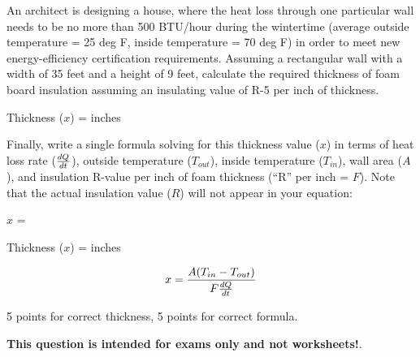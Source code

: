 

An architect is designing a house, where the heat loss through one particular wall needs to be no more than 500 BTU/hour during the wintertime (average outside temperature = 25 deg F, inside temperature = 70 deg F) in order to meet new energy-efficiency certification requirements.  Assuming a rectangular wall with a width of 35 feet and a height of 9 feet, calculate the required thickness of foam board insulation assuming an insulating value of R-5 per inch of thickness.

\vskip 10pt

Thickness ($x$) = \underbar{\hskip 50pt} inches

\vskip 10pt

Finally, write a single formula solving for this thickness value ($x$) in terms of heat loss rate ($dQ \over dt$), outside temperature ($T_{out}$), inside temperature ($T_{in}$), wall area ($A$), and insulation R-value per inch of foam thickness (``R'' per inch = $F$).  Note that the actual insulation value ($R$) will not appear in your equation:

\vskip 20pt

$x$ = 

\vskip 20pt







Thickness ($x$) =  inches

\vskip 10pt

$$x = {{A (T_{in} - T_{out})} \over {F {dQ \over dt}}}$$

\vskip 10pt

5 points for correct thickness, 5 points for correct formula.







{\bf This question is intended for exams only and not worksheets!}.


